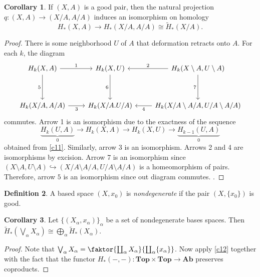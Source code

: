 \documentclass[10pt,letterpaper,cm]{nupset}
\theoremstyle{definition}
\newtheorem{definition}{Definition}[subsection]
\theoremstyle{theorem}
\newtheorem{corollary}[definition]{Corollary}
\theoremstyle{remark}
\newcommand{\1}{\mathbb{1}}
\newcommand{\0}{\vec 0}
\begin{document}
\begin{corollary}
If $(X,A)$ is a good pair, then the natural projection $q: (X, A) \to (X/A, A/A)$ induces an isomorphism on homology $$ H_{\ast}(X,A) \to H_{\ast}(X/A, A/A) \cong \widetilde{H}_{\ast}(X/A)  .$$
\end{corollary}
\begin{proof}
There is some neighborhood $U$ of $A$ that deformation retracts onto $A$. For each $k$, the diagram 
\[
\begin{tikzcd}
{H_k(X,A)} \arrow[dd, "5"'] \arrow[r, "1"] & {H_k(X,U)} \arrow[dd, "6"'] & {H_k(X\setminus A, U \setminus A)} \arrow[l, "2"'] \arrow[dd, "7"'] \\
                                           &                             &                                                                     \\
{H_k(X/A, A/A)} \arrow[r, "3"']            & H_k(X/A. U/A)               & {H_k(X/A \setminus A/A, U/A \setminus A/A)} \arrow[l, "4"]         
\end{tikzcd}
\] commutes. Arrow 1 is an isomorphism due to the exactness of the sequence $$\underbrace{H_k(U, A)}_{0} \to H_k(X,A) \to H_k(X,U) \to \underbrace{H_{k-1}(U,A)}_{0}$$ obtained from \cref{c11}. Similarly, arrow 3 is an isomorphism. Arrows 2 and 4 are isomorphisms by excision. Arrow 7 is an isomorphism since $(X\setminus A , U \setminus A) \hookrightarrow (X/A \setminus A/A, U/A \setminus A/A)$ is a homeomorphism of pairs. Therefore, arrow $5$ is an isomorphism since out diagram commutes. . 
\end{proof}

\begin{definition}
A based space $(X,x_0)$ is \textit{nondegenerate} if the pair $(X, \{x_0\})$ is good. 
\end{definition}

\begin{corollary}
Let $\{(X_{\alpha}, x_{\alpha})\}_{\alpha}$ be a set of nondegenerate bases spaces. Then $\widetilde{H}_{\ast}(\bigvee_{\alpha} X_{\alpha}) \cong \bigoplus_{\alpha} \widetilde{H}_{\ast}(X_{\alpha}).$
\end{corollary}
\begin{proof}
Note that $\bigvee_{\alpha} X_{\alpha} = \faktor{\coprod_{\alpha}X_{\alpha}}{\coprod_{\alpha} \{x_{\alpha}\}}$. Now apply \cref{c12} together with the fact that the functor $H_{\ast}({-}, {-}): \mathbf{Top}\times \mathbf{Top} \to \mathbf{Ab}$ preserves coproducts. 
\end{proof}
\end{document}
